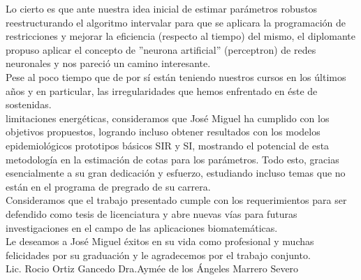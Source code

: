 \begin{opinion}
Lo cierto es que ante nuestra idea inicial de estimar parámetros robustos
reestructurando el algoritmo intervalar para que se aplicara la programación de
restricciones y mejorar la eficiencia (respecto al tiempo) del mismo, el diplomante
propuso aplicar el concepto de ”neurona artificial” (perceptron) de redes neuronales y
nos pareció un camino interesante. \\

Pese al poco tiempo que de por sí están teniendo nuestros cursos en los últimos años y
en particular, las irregularidades que hemos enfrentado en éste de sostenidas. \\

limitaciones energéticas, consideramos que José Miguel ha cumplido con los objetivos
propuestos, logrando incluso obtener resultados con los modelos epidemiológicos
prototipos básicos SIR y SI, mostrando el potencial de esta metodología en la
estimación de cotas para los parámetros. Todo esto, gracias esencialmente a su gran
dedicación y esfuerzo, estudiando incluso temas que no están en el programa de
pregrado de su carrera. \\

Consideramos que el trabajo presentado cumple con los requerimientos para ser
defendido como tesis de licenciatura y abre nuevas vías para futuras investigaciones en
el campo de las aplicaciones biomatemáticas. \\

Le deseamos a José Miguel éxitos en su vida como profesional y muchas felicidades por
su graduación y le agradecemos por el trabajo conjunto. \\

Lic. Rocio Ortiz Gancedo \space \space \space \space \space \space \space \space \space \space Dra.Aymée de los Ángeles Marrero Severo




\end{opinion}